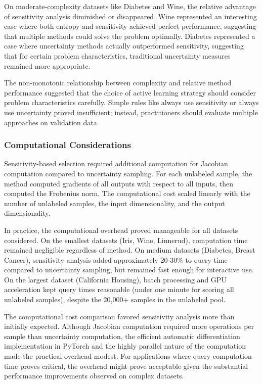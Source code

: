 \documentclass[conference]{IEEEtran}
\begin{document}
On moderate-complexity datasets like Diabetes and Wine, the relative advantage of sensitivity analysis diminished or disappeared. Wine represented an interesting case where both entropy and sensitivity achieved perfect performance, suggesting that multiple methods could solve the problem optimally. Diabetes represented a case where uncertainty methods actually outperformed sensitivity, suggesting that for certain problem characteristics, traditional uncertainty measures remained more appropriate.

The non-monotonic relationship between complexity and relative method performance suggested that the choice of active learning strategy should consider problem characteristics carefully. Simple rules like always use sensitivity or always use uncertainty proved insufficient; instead, practitioners should evaluate multiple approaches on validation data.

\subsubsection{Computational Considerations}

Sensitivity-based selection required additional computation for Jacobian computation compared to uncertainty sampling. For each unlabeled sample, the method computed gradients of all outputs with respect to all inputs, then computed the Frobenius norm. The computational cost scaled linearly with the number of unlabeled samples, the input dimensionality, and the output dimensionality.

In practice, the computational overhead proved manageable for all datasets considered. On the smallest datasets (Iris, Wine, Linnerud), computation time remained negligible regardless of method. On medium datasets (Diabetes, Breast Cancer), sensitivity analysis added approximately 20-30\% to query time compared to uncertainty sampling, but remained fast enough for interactive use. On the largest dataset (California Housing), batch processing and GPU acceleration kept query times reasonable (under one minute for scoring all unlabeled samples), despite the 20,000+ samples in the unlabeled pool.

The computational cost comparison favored sensitivity analysis more than initially expected. Although Jacobian computation required more operations per sample than uncertainty computation, the efficient automatic differentiation implementation in PyTorch and the highly parallel nature of the computation made the practical overhead modest. For applications where query computation time proves critical, the overhead might prove acceptable given the substantial performance improvements observed on complex datasets.
\end{document}
